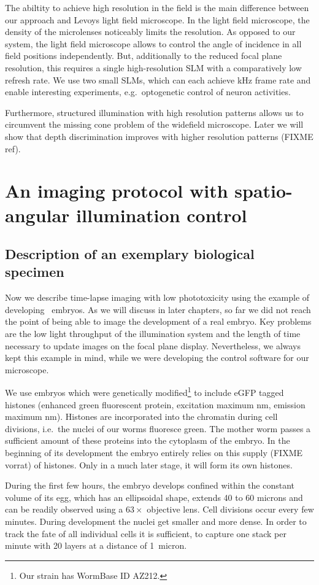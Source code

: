 The abiltity to achieve high resolution in the field is the main
difference between our approach and Levoys light field microscope.  In
the light field microscope, the density of the microlenses noticeably
limits the resolution. As opposed to our system, the light field microscope allows to
control the angle of incidence in all field positions independently.
But, additionally to the reduced focal plane resolution, this requires a single high-resolution SLM with a comparatively
low refresh rate. We use two small SLMs, which can each achieve
\unit[1]{kHz} frame rate and enable interesting experiments,
e.g.\ optogenetic control of neuron activities.

Furthermore, structured illumination with high resolution patterns allows us to
circumvent the missing cone problem of the widefield microscope.
Later we will show that depth
discrimination improves with higher resolution patterns (FIXME ref).
\section{An imaging protocol with spatio-angular illumination control}
\subsection{Description of an exemplary biological specimen}
Now we describe time-lapse imaging with low phototoxicity using the
example of developing \celegans\ embryos. As we will discuss in later chapters, so far we did not reach
the point of being able to image the development of a real embryo. Key
problems are  the low light throughput of the illumination
system and the length of time necessary to update images on the focal
plane display. Nevertheless, we always kept this example in mind,
while we were developing the control software for our microscope.

We use embryos which  were genetically modified\footnote{Our strain has WormBase ID AZ212.}
to include eGFP tagged histones (enhanced green fluorescent protein,
excitation maximum \unit[488]{nm}, emission maximum
\unit[509]{nm}). Histones are incorporated into the chromatin during cell
divisions, i.e.\ the nuclei of our worms fluoresce green.
 The mother worm passes a sufficient amount of these
proteins into the cytoplasm of the embryo. In the beginning of its development the embryo
entirely relies on this supply  (FIXME vorrat) of histones. Only in a much later stage,
it will form its own histones. 

During the first few hours, the embryo develops confined within the
constant volume of its egg, which has an ellipsoidal shape,
extends 40 to 60 microns and can be readily observed using a
$63\times$ objective lens. Cell divisions occur every few minutes.
During development the nuclei get smaller and more
dense. In order to track the fate of all individual cells it is sufficient, to
capture one stack per minute with 20 layers at a distance of 1~micron.
